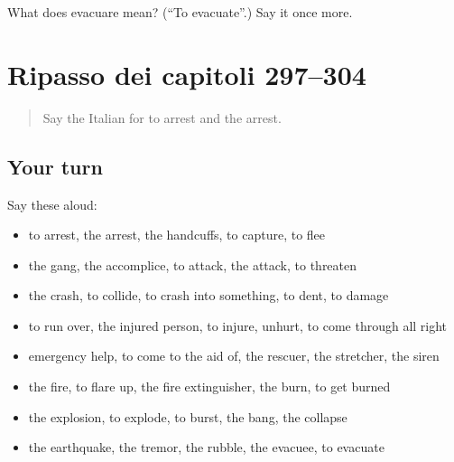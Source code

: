 \begin{tcolorbox}[breakable,colback=teal!4,colframe=teal!35!black,title={Before you move on}]
What does evacuare mean? (\textquotedblleft{}To evacuate\textquotedblright{}.) Say it once more.
\end{tcolorbox}
\section[(dialogue)]{Ripasso dei capitoli 297–304}

\label{lesson:IT-R304-ripasso-297-304}



\begin{quote}
Say the Italian for to arrest and the arrest.
\end{quote}

\subsection*{Your turn}
Say these aloud:

\begin{itemize}
\raggedright
  \item to arrest, the arrest, the handcuffs, to capture, to flee
  \item the gang, the accomplice, to attack, the attack, to threaten
  \item the crash, to collide, to crash into something, to dent, to damage
  \item to run over, the injured person, to injure, unhurt, to come through all right
  \item emergency help, to come to the aid of, the rescuer, the stretcher, the siren
  \item the fire, to flare up, the fire extinguisher, the burn, to get burned
  \item the explosion, to explode, to burst, the bang, the collapse
  \item the earthquake, the tremor, the rubble, the evacuee, to evacuate
\end{itemize}

